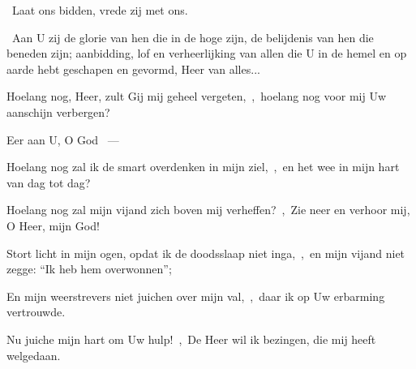 \documentclass[12pt,twoside,a5paper]{article}
\begin{document}
\begin{halfparskip}
  \dd~Laat ons bidden, vrede zij met ons.

  \cc~Aan U zij de glorie van hen die in de hoge zijn, de belijdenis van hen die beneden zijn; aanbidding, lof en verheerlijking van allen die U in de hemel en op aarde hebt geschapen en gevormd, Heer van alles...
\end{halfparskip}



\begin{halfparskip}
   

  Hoelang nog, Heer, zult Gij mij geheel vergeten,~\sep\ hoelang nog voor mij Uw aanschijn verbergen?

  Eer aan U, O God ~---  

  Hoelang nog zal ik de smart overdenken in mijn ziel,~\sep\ en het wee in mijn hart van dag tot dag?

  Hoelang nog zal mijn vijand zich boven mij verheffen?~\sep\ Zie neer en verhoor mij, O Heer, mijn God!

  Stort licht in mijn ogen, opdat ik de doodsslaap niet inga,~\sep\ en mijn vijand niet zegge: ``Ik heb hem overwonnen'';

  En mijn weerstrevers niet juichen over mijn val,~\sep\ daar ik op Uw erbarming vertrouwde.

  Nu juiche mijn hart om Uw hulp!~\sep\ De Heer wil ik bezingen, die mij heeft welgedaan.
\end{halfparskip}
\end{document}
